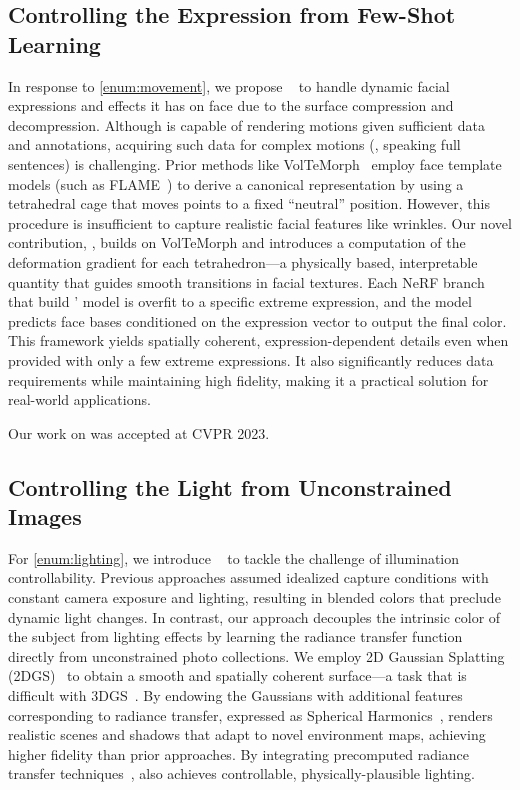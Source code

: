  \subsection{Controlling the Expression from Few-Shot Learning}
    In response to \ref{enum:movement}, we propose
    \blendfields~\cite{kania2023blendfields} to handle dynamic facial expressions
    and effects it has on face due to the surface compression and decompression.
    Although \conerf is capable of rendering motions given sufficient data and
    annotations, acquiring such data for complex motions (\eg, speaking full
    sentences) is challenging.
    Prior methods like VolTeMorph~\cite{garbin2024voltemorph} employ face template
    models (such as FLAME~\cite{li2017flame}) to derive a canonical representation
    by using a tetrahedral cage that moves points to a fixed ``neutral'' position.
    However, this procedure is insufficient to capture realistic facial features
    like wrinkles.
    Our novel contribution, \blendfields, builds on VolTeMorph and introduces a
    computation of the deformation gradient for each tetrahedron---a physically
    based, interpretable quantity that guides smooth transitions in facial
    textures.
    Each NeRF branch that build \blendfields' model is overfit to a specific
    extreme expression, and the model predicts face bases conditioned on the
    expression vector to output the final color.
    This framework yields spatially coherent, expression-dependent details even
    when provided with only a few extreme expressions.
    It also significantly reduces data requirements while maintaining high
    fidelity, making it a practical solution for real-world applications.

    Our work on \blendfields was accepted at CVPR 2023.

  \subsection{Controlling the Light from Unconstrained Images}
    For \ref{enum:lighting}, we introduce \lumigauss~\cite{kaleta2024lumigauss} to
    tackle the challenge of illumination controllability.
    Previous approaches assumed idealized capture conditions with constant camera
    exposure and lighting, resulting in blended colors that preclude dynamic light
    changes.
    In contrast, our approach decouples the intrinsic color of the subject from
    lighting effects by learning the radiance transfer function directly from
    unconstrained photo collections.
    We employ 2D Gaussian Splatting (2DGS)~\cite{huang20242d} to obtain a smooth
    and spatially coherent surface---a task that is difficult with
    3DGS~\cite{kerbl20233d}.
    By endowing the Gaussians with additional features corresponding to radiance
    transfer, expressed as Spherical Harmonics~\cite{green2003grittydetail},
    \lumigauss renders realistic scenes and shadows that adapt to novel
    environment maps, achieving higher fidelity than prior approaches.
    By integrating precomputed radiance transfer techniques~\cite{slomp2006gentle,
      ramamoorthi2001envmap}, \lumigauss also achieves controllable,
    physically-plausible lighting.

